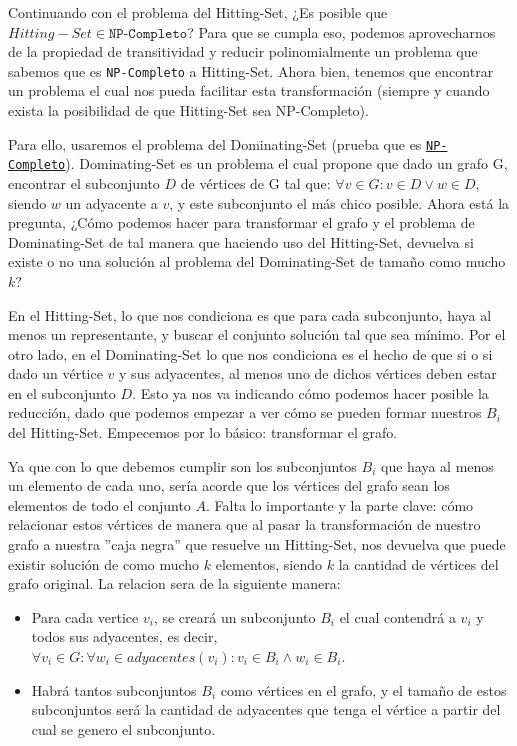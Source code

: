 Continuando con el problema del Hitting-Set, ¿Es posible que $Hitting-Set \in \texttt{NP-Completo}$?
Para que se cumpla eso, podemos aprovecharnos de la propiedad de transitividad y reducir polinomialmente un problema que sabemos que es \texttt{NP-Completo} a Hitting-Set. Ahora bien, tenemos que encontrar un problema el cual nos pueda facilitar esta transformación (siempre y cuando exista la posibilidad de que Hitting-Set sea NP-Completo).

Para ello, usaremos el problema del Dominating-Set (prueba que es \href{https://www.geeksforgeeks.org/proof-that-dominant-set-of-a-graph-is-np-complete/}{\texttt{NP-Completo}}). Dominating-Set es un problema el cual propone que dado un grafo G, encontrar el subconjunto $D$ de vértices de G tal que: $\forall v \in G: v \in D \lor w \in D$, siendo $w$ un adyacente a $v$, y este subconjunto el más chico posible. Ahora está la pregunta, ¿Cómo podemos hacer para transformar el grafo y el problema de Dominating-Set de tal manera que haciendo uso del Hitting-Set, devuelva si existe o no una solución al problema del Dominating-Set de tamaño como mucho $k$?

En el Hitting-Set, lo que nos condiciona es que para cada subconjunto, haya al menos un representante, y buscar el conjunto solución tal que sea mínimo. Por el otro lado, en el Dominating-Set lo que nos condiciona es el hecho de que si o si dado un vértice $v$ y sus adyacentes, al menos uno de dichos vértices deben estar en el subconjunto $D$. Esto ya nos va indicando cómo podemos hacer posible la reducción, dado que podemos empezar a ver cómo se pueden formar nuestros $B_i$ del Hitting-Set. Empecemos por lo básico: transformar el grafo.

Ya que con lo que debemos cumplir son los subconjuntos $B_i$ que haya al menos un elemento de cada uno, sería acorde que los vértices del grafo sean los elementos de todo el conjunto $A$. Falta lo importante y la parte clave: cómo relacionar estos vértices de manera que al pasar la transformación de nuestro grafo a nuestra ''caja negra'' que resuelve un Hitting-Set, nos devuelva que puede existir solución de como mucho $k$ elementos, siendo $k$ la cantidad de vértices del grafo original. La relacion sera de la siguiente manera:
\begin{itemize}
    \item Para cada vertice $v_i$, se creará un subconjunto $B_i$ el cual contendrá a $v_i$ y todos sus adyacentes, es decir, $\forall v_i \in G: \forall w_i \in adyacentes(v_i): v_i \in B_i \land w_i \in B_i$.
    \item Habrá tantos subconjuntos $B_i$ como vértices en el grafo, y el tamaño de estos subconjuntos será la cantidad de adyacentes que tenga el vértice a partir del cual se genero el subconjunto.
\end{itemize}


